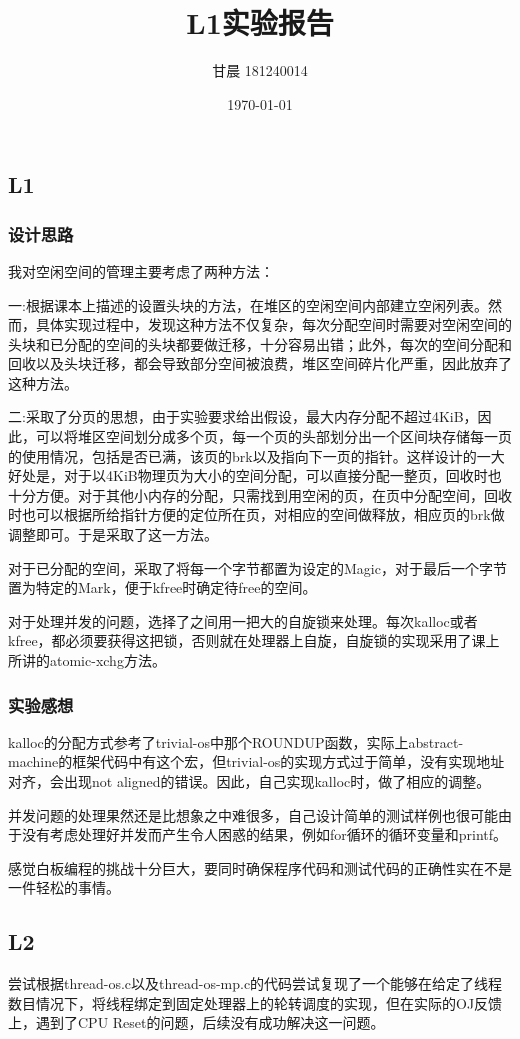 \documentclass[UTF8]{ctexart}
\title{L1实验报告}
\author{甘晨 181240014}
\date{\today}
\begin{document}
\maketitle
\subsection{L1}
\subsubsection{设计思路}
\par 我对空闲空间的管理主要考虑了两种方法：

\par 一:根据课本上描述的设置头块的方法，在堆区的空闲空间内部建立空闲列表。然而，具体实现过程中，发现这种方法不仅复杂，每次分配空间时需要对空闲空间的头块和已分配的空间的头块都要做迁移，十分容易出错；此外，每次的空间分配和回收以及头块迁移，都会导致部分空间被浪费，堆区空间碎片化严重，因此放弃了这种方法。

\par 二:采取了分页的思想，由于实验要求给出假设，最大内存分配不超过4KiB，因此，可以将堆区空间划分成多个页，每一个页的头部划分出一个区间块存储每一页的使用情况，包括是否已满，该页的brk以及指向下一页的指针。这样设计的一大好处是，对于以4KiB物理页为大小的空间分配，可以直接分配一整页，回收时也十分方便。对于其他小内存的分配，只需找到用空闲的页，在页中分配空间，回收时也可以根据所给指针方便的定位所在页，对相应的空间做释放，相应页的brk做调整即可。于是采取了这一方法。

\par 对于已分配的空间，采取了将每一个字节都置为设定的Magic，对于最后一个字节置为特定的Mark，便于kfree时确定待free的空间。

\par 对于处理并发的问题，选择了之间用一把大的自旋锁来处理。每次kalloc或者kfree，都必须要获得这把锁，否则就在处理器上自旋，自旋锁的实现采用了课上所讲的atomic-xchg方法。

\subsubsection{实验感想}
\par kalloc的分配方式参考了trivial-os中那个ROUNDUP函数，实际上abstract-machine的框架代码中有这个宏，但trivial-os的实现方式过于简单，没有实现地址对齐，会出现not aligned的错误。因此，自己实现kalloc时，做了相应的调整。

\par 并发问题的处理果然还是比想象之中难很多，自己设计简单的测试样例也很可能由于没有考虑处理好并发而产生令人困惑的结果，例如for循环的循环变量和printf。

\par 感觉白板编程的挑战十分巨大，要同时确保程序代码和测试代码的正确性实在不是一件轻松的事情。

\subsection{L2}
\par 尝试根据thread-os.c以及thread-os-mp.c的代码尝试复现了一个能够在给定了线程数目情况下，将线程绑定到固定处理器上的轮转调度的实现，但在实际的OJ反馈上，遇到了CPU Reset的问题，后续没有成功解决这一问题。
\end{document}
